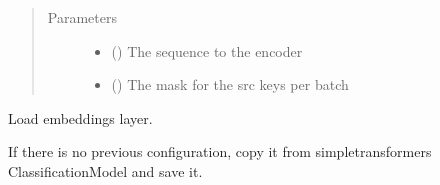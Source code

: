 \documentclass[letterpaper,10pt,english]{sphinxmanual}
\begin{document}
\begin{fulllineitems}
\begin{fulllineitems}
\end{fulllineitems}


\begin{fulllineitems}
\label{\detokenize{dc_custom_model:src.domain_classifier.custom_model.CustomModel.forward}}\begin{quote}\begin{description}
\item[{Parameters}] \leavevmode\begin{itemize}
\item {} 
\sphinxAtStartPar
{} () \textendash{} The sequence to the encoder

\item {} 
\sphinxAtStartPar
{} () \textendash{} The mask for the src keys per batch

\end{itemize}

\end{description}\end{quote}

\end{fulllineitems}


\begin{fulllineitems}
\label{\detokenize{dc_custom_model:src.domain_classifier.custom_model.CustomModel.load_embeddings}}
\sphinxAtStartPar
Load embeddings layer.

\sphinxAtStartPar
If there is no previous configuration, copy it from simpletransformers
ClassificationModel and save it.

\end{fulllineitems}



\end{fulllineitems}
\end{document}
